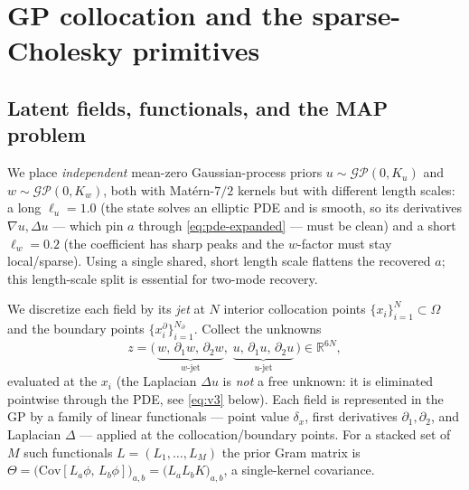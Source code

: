 \documentclass[11pt]{article}
\newcommand{\R}{\mathbb{R}}
\newcommand{\cGP}{\mathcal{GP}}
\begin{document}
\section{GP collocation and the sparse-Cholesky primitives}\label{sec:gp}

\subsection{Latent fields, functionals, and the MAP problem}

We place \emph{independent} mean-zero Gaussian-process priors
$u\sim\cGP(0,K_u)$ and $w\sim\cGP(0,K_w)$, both with Mat\'ern-$7/2$ kernels but
with different length scales: a long $\ell_u=1.0$ (the state solves an elliptic
PDE and is smooth, so its derivatives $\nabla u,\Delta u$ --- which pin $a$
through \eqref{eq:pde-expanded} --- must be clean) and a short $\ell_w=0.2$ (the
coefficient has sharp peaks and the $w$-factor must stay local/sparse). Using a
single shared, short length scale flattens the recovered $a$; this length-scale
split is essential for two-mode recovery.

We discretize each field by its \emph{jet} at $N$ interior collocation points
$\{x_i\}_{i=1}^N\subset\Omega$ and the boundary points
$\{x_i^\partial\}_{i=1}^{N_\partial}$. Collect the unknowns
\begin{equation}
z = \bigl(\,\underbrace{w,\,\partial_1 w,\,\partial_2 w}_{w\text{-jet}},\;
            \underbrace{u,\,\partial_1 u,\,\partial_2 u}_{u\text{-jet}}\,\bigr)\in\R^{6N},
\end{equation}
evaluated at the $x_i$ (the Laplacian $\Delta u$ is \emph{not} a free unknown:
it is eliminated pointwise through the PDE, see \eqref{eq:v3} below). Each field
is represented in the GP by a family of linear functionals --- point value
$\delta_x$, first derivatives $\partial_1,\partial_2$, and Laplacian $\Delta$
--- applied at the collocation/boundary points. For a stacked set of $M$ such
functionals $L=(L_1,\dots,L_M)$ the prior Gram matrix is
$\Theta = \bigl(\mathrm{Cov}[L_a\phi,\,L_b\phi]\bigr)_{a,b}=\bigl(L_a L_b
K\bigr)_{a,b}$, a single-kernel covariance.
\end{document}
